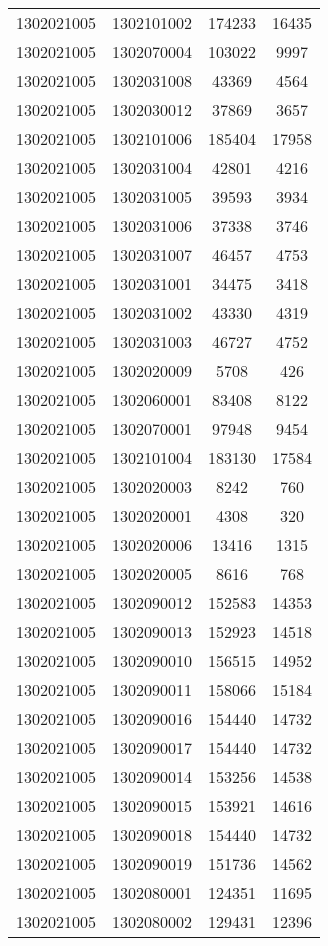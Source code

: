 \begin{longtable}{llcc}
1302021005 & 1302101002 & 174233 & 16435\\
1302021005 & 1302070004 & 103022 & 9997\\
1302021005 & 1302031008 & 43369 & 4564\\
1302021005 & 1302030012 & 37869 & 3657\\
1302021005 & 1302101006 & 185404 & 17958\\
1302021005 & 1302031004 & 42801 & 4216\\
1302021005 & 1302031005 & 39593 & 3934\\
1302021005 & 1302031006 & 37338 & 3746\\
1302021005 & 1302031007 & 46457 & 4753\\
1302021005 & 1302031001 & 34475 & 3418\\
1302021005 & 1302031002 & 43330 & 4319\\
1302021005 & 1302031003 & 46727 & 4752\\
1302021005 & 1302020009 & 5708 & 426\\
1302021005 & 1302060001 & 83408 & 8122\\
1302021005 & 1302070001 & 97948 & 9454\\
1302021005 & 1302101004 & 183130 & 17584\\
1302021005 & 1302020003 & 8242 & 760\\
1302021005 & 1302020001 & 4308 & 320\\
1302021005 & 1302020006 & 13416 & 1315\\
1302021005 & 1302020005 & 8616 & 768\\
1302021005 & 1302090012 & 152583 & 14353\\
1302021005 & 1302090013 & 152923 & 14518\\
1302021005 & 1302090010 & 156515 & 14952\\
1302021005 & 1302090011 & 158066 & 15184\\
1302021005 & 1302090016 & 154440 & 14732\\
1302021005 & 1302090017 & 154440 & 14732\\
1302021005 & 1302090014 & 153256 & 14538\\
1302021005 & 1302090015 & 153921 & 14616\\
1302021005 & 1302090018 & 154440 & 14732\\
1302021005 & 1302090019 & 151736 & 14562\\
1302021005 & 1302080001 & 124351 & 11695\\
1302021005 & 1302080002 & 129431 & 12396\\

\end{longtable}
